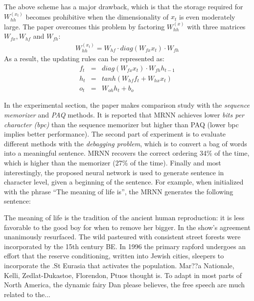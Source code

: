 The above scheme has a major drawback, which is that the storage required for $W_{hh}^{(x_t)}$ becomes prohibitive when the dimensionality of $x_t$ is even moderately large. The paper overcomes this problem by factoring $W_{hh}^{(x)}$ with three matrices $W_{fx}, W_{hf}$ and $W_{fh}$:
\begin{eqnarray}
W_{hh}^{(x_t)} = W_{hf} \cdot diag(W_{fx}x_t) \cdot W_{fh}
\end{eqnarray}
As a result, the updating rules can be represented as:
\begin{eqnarray}
f_t &=& diag(W_{fx}x_t) \cdot W_{fh}h_{t-1}\\
h_t &=& tanh(W_{hf}f_t + W_{hx}x_t)\\
o_t &=& W_{oh}h_t + b_o
\end{eqnarray}

In the experimental section, the paper makes comparison study with the \emph{sequence memorizer}  and \emph{PAQ}  methods. It is reported that MRNN achieves lower \emph{bits per character (bpc)} than the sequence memorizer but higher than PAQ (lower bpc implies better performance). The second part of experiment is to evaluate different methods with the \emph{debagging problem}, which is to convert a bag of words into a meaningful sentence. MRNN recovers the correct ordering 34\% of the time, which is higher than the memorizer (27\% of the time). Finally and most interestingly, the proposed neural network is used to generate sentence in character level, given a beginning of the sentence. For example, when initialized with the phrase ``The meaning of life is'', the MRNN generates the following sentence:

\begin{small}
The meaning of life is the tradition of the ancient human reproduction: it is less favorable to the good boy for when to remove her bigger. In the show's agreement unanimously resurfaced. The wild pasteured with consistent street forests were incorporated by the 15th century BE. In 1996 the primary rapford undergoes an effort that the reserve conditioning, written into Jewish cities, sleepers to incorporate the .St Eurasia that activates the population. Mar??a Nationale, Kelli, Zedlat-Dukastoe, Florendon, Ptuos thought is. To adapt in most parts of North America, the dynamic fairy Dan please believes, the free speech are much related to the...
\end{small}
